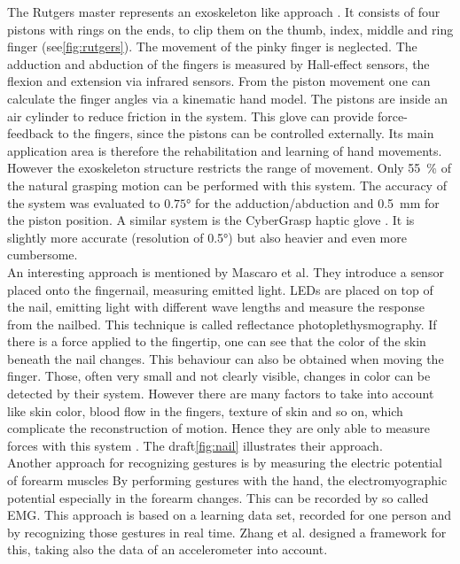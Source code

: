 The Rutgers master  represents an exoskeleton like approach \cite{bouzit2002rutgers}. It consists of four pistons with rings on the ends, to clip them on the thumb, index, middle and ring finger (see\ref{fig:rutgers}). The movement of the pinky finger is neglected. The adduction and abduction of the fingers is measured by Hall-effect sensors, the flexion and extension via infrared sensors. From the piston movement one can calculate the finger angles via a kinematic hand model. The pistons are inside an air cylinder to reduce friction in the system. This glove can provide force-feedback to the fingers, since the pistons can be controlled externally. Its main application area is therefore the rehabilitation and learning of hand movements. However the exoskeleton structure restricts the range of movement. Only \SI{55}{\percent} of the natural grasping motion can be performed with this system. The accuracy of the system was evaluated to $ \ang{0.75} $ for the adduction/abduction and \SI{0.5}{mm} for the piston position. A similar system is the CyberGrasp haptic glove \cite{cyberglove}. It is slightly more accurate (resolution of \ang{0.5}) but also heavier and even more cumbersome.\\
An interesting approach is mentioned by Mascaro et al. They introduce a sensor placed onto the fingernail, measuring emitted light. LEDs are placed on top of the nail, emitting light with different wave lengths and measure the response from the nailbed. This technique is called reflectance photoplethysmography. If there is a force applied to the fingertip, one can see that the color of the skin beneath the nail changes. This behaviour can also be obtained when moving the finger. Those, often very small and not clearly visible, changes in color can be detected by their system. However there are many factors to take into account like skin color, blood flow in the fingers, texture of skin and so on, which complicate the reconstruction of motion. Hence they are only able to measure forces with this system \cite{mascaro2001photoplethysmograph}. The draft\ref{fig:nail} illustrates their approach.\\
Another approach for recognizing gestures is by measuring the electric potential of forearm muscles \cite{kim2008emg} By performing gestures with the hand, the electromyographic potential especially in the forearm changes. This can be recorded by so called \ac{EMG}. This approach is based on a learning data set, recorded for one person and by recognizing those gestures in real time. Zhang et al. designed a framework for this, taking also the data of an accelerometer into account.

